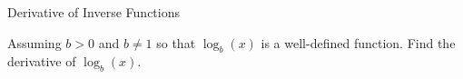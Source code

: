 \documentclass[../main.tex]{subfiles}
\begin{document}
\begin{lesson}{Derivative of Inverse Functions}

  \begin{example}
    Assuming \(b > 0\) and \(b \ne 1\) so that \(\log_{b}(x)\) is a well-defined function.
    Find the derivative of \(\log_{b}(x)\).
  \end{example}

\end{lesson}
\end{document}
